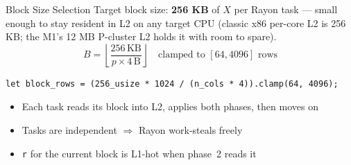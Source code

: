 \documentclass[aspectratio=169]{beamer}
\begin{document}
\begin{frame}[fragile]{Block Size Selection}
  Target block size: \textbf{256 KB} of $X$ per Rayon task --- small enough to stay
  resident in L2 on any target CPU (classic x86 per-core L2 is 256 KB; the M1's
  12 MB P-cluster L2 holds it with room to spare).
  \[
    B = \left\lfloor\frac{256\,\text{KB}}{p \times 4\,\text{B}}\right\rfloor
    \quad \text{clamped to } [64, 4096] \text{ rows}
  \]
\begin{lstlisting}
let block_rows = (256_usize * 1024 / (n_cols * 4)).clamp(64, 4096);
\end{lstlisting}

  \vspace{0.4em}
  \begin{itemize}
    \item Each task reads its block into L2, applies both phases, then moves on
    \item Tasks are independent $\Rightarrow$ Rayon work-steals freely
    \item \texttt{r} for the current block is L1-hot when phase~2 reads it
  \end{itemize}
\end{frame}
\end{document}
